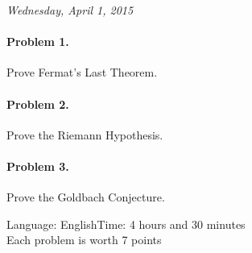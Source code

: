 \documentclass[a4paper,11pt]{article}
\newcommand{\xmoproblemword}{Problem}
\newcommand{\xmolanguagename}{English}
\newcommand{\xmotime}{Time: 4 hours and 30 minutes}
\newcommand{\xmomarks}{Each problem is worth 7 points}
\newcommand{\xmodate}{Wednesday, April 1, 2015}
\newenvironment{xmoproblem}[1]{\paragraph*{\xmoproblemword{} #1.}}{}
\newenvironment{xmopaper}{
\begin{flushright}
\textit{\xmodate}
\end{flushright}
}{
\vfill
\begin{flushright}
Language: \xmolanguagename\hfill\xmotime \\
\xmomarks
\end{flushright}
}
\begin{document}
\begin{xmopaper}
%
%
\begin{xmoproblem}{1}
Prove Fermat's Last Theorem.
\end{xmoproblem}

\begin{xmoproblem}{2}
Prove the Riemann Hypothesis.
\end{xmoproblem}

\begin{xmoproblem}{3}
Prove the Goldbach Conjecture.
\end{xmoproblem}

\end{xmopaper}
\end{document}
